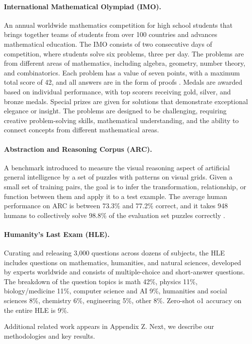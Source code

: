 \paragraph{International Mathematical Olympiad (IMO).}
An annual worldwide mathematics competition for high school students \cite{imo} that brings together teams of students from over 100 countries and advances mathematical education. The IMO consists of two consecutive days of competition, where students solve six problems, three per day. The problems are from different areas of mathematics, including algebra, geometry, number theory, and combinatorics. Each problem has a value of seven points, with a maximum total score of 42, and all answers are in the form of proofs \cite{imo2024regulations}. Medals are awarded based on individual performance, with top scorers receiving gold, silver, and bronze medals. Special prizes are given for solutions that demonstrate exceptional elegance or insight. The problems are designed to be challenging, requiring creative problem-solving skills, mathematical understanding, and the ability to connect concepts from different mathematical areas.


\paragraph{Abstraction and Reasoning Corpus (ARC).}
A benchmark introduced \cite{chollet2019measure} to measure the visual reasoning aspect of artificial general intelligence by a set of puzzles with patterns on visual grids. Given a small set of training pairs, the goal is to infer the transformation, relationship, or function between them and apply it to a test example. The average human performance on ARC is between 73.3\% and 77.2\% correct, and it takes 948 humans to collectively solve 98.8\% of the evaluation set puzzles correctly \cite{legris2024h}.

\paragraph{Humanity's Last Exam (HLE).}
Curating and releasing 3,000 questions across dozens of subjects, the HLE \cite{phan2025hle} includes questions on mathematics, humanities, and natural sciences, developed by experts worldwide and consists of multiple-choice and short-answer questions. The breakdown of the question topics is math 42\%, physics 11\%, biology/medicine 11\%, computer science and AI 9\%, humanities and social sciences 8\%, chemistry 6\%, engineering 5\%, other 8\%. Zero-shot o1 accuracy on the entire HLE is 9\%.


Additional related work appears in Appendix Z. Next, we describe our methodologies and key results.

